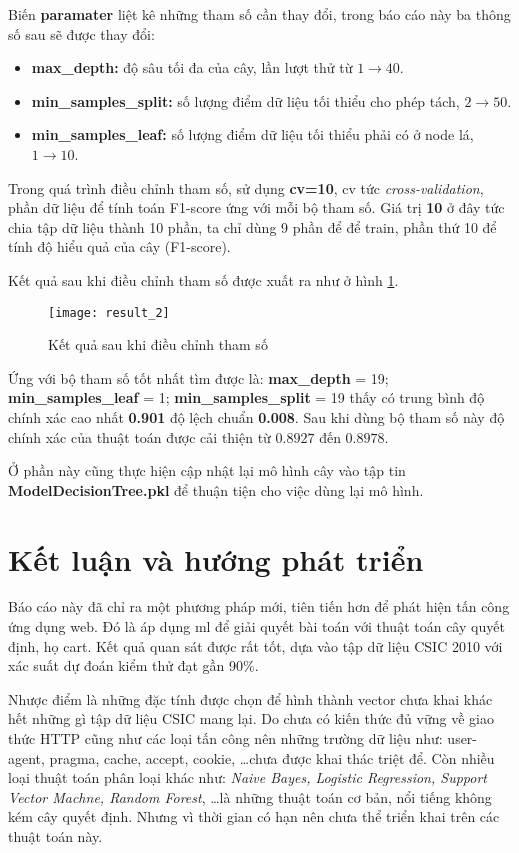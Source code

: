 \documentclass[../main-report.tex]{subfiles}
\begin{document}
Biến \textbf{paramater} liệt kê những tham số cần thay đổi, trong báo cáo này ba thông số sau sẽ được thay đổi:

\begin{itemize}
\item \textbf{max\_depth:} độ sâu tối đa của cây, lần lượt thử từ $1 \to 40$.
\item \textbf{min\_samples\_split:} số lượng điểm dữ liệu tối thiểu cho phép tách, $2 \to 50$.
\item \textbf{min\_samples\_leaf:} số lượng điểm dữ liệu tối thiểu phải có ở node lá, $1 \to 10$.
\end{itemize}

Trong quá trình điều chỉnh tham số, sử dụng \textbf{cv=10}, cv tức \emph{cross-validation}, phần dữ liệu để tính toán F1-score ứng với mỗi bộ tham số. Giá trị \textbf{10} ở đây tức chia tập dữ liệu thành 10 phần, ta chỉ dùng 9 phần để để train, phần thứ 10 để tính độ hiểu quả của cây (F1-score).

Kết quả sau khi điều chỉnh tham số được xuất ra như ở hình \ref{fig:result_2}.

\begin{figure}[ht!]
\centering\texttt{[image: result\_2]}
\caption{Kết quả sau khi điều chỉnh tham số}
\label{fig:result_2}
\end{figure}

Ứng với bộ tham số tốt nhất tìm được là: \textbf{max\_depth} = 19; \textbf{min\_samples\_leaf} = 1; \textbf{min\_samples\_split} = 19  thấy có trung bình độ chính xác cao nhất \textbf{0.901} độ lệch chuẩn \textbf{0.008}. Sau khi dùng bộ tham số này độ chính xác của thuật toán được cải thiện từ $0.8927$ đến $0.8978$.

Ở phần này cũng thực hiện cập nhật lại mô hình cây vào tập tin \textbf{ModelDecisionTree.pkl} để thuận tiện cho việc dùng lại mô hình.

\section{Kết luận và hướng phát triển}
Báo cáo này đã chỉ ra một phương pháp mới, tiên tiến hơn để phát hiện tấn công ứng dụng web. Đó là áp dụng \gls{ml} để giải quyết bài toán với thuật toán cây quyết định, họ \acrshort{cart}. Kết quả quan sát được rất tốt, dựa vào tập dữ liệu CSIC 2010 với xác suất dự đoán kiểm thử đạt gần 90\%.

Nhược điểm là những đặc tính được chọn để hình thành vector chưa khai khác hết những gì tập dữ liệu CSIC mang lại. Do chưa có kiến thức đủ vững về giao thức HTTP cũng như các loại tấn công nên những trường dữ liệu như: user-agent, pragma, cache, accept, cookie, \ldots chưa được khai thác triệt để. Còn nhiều loại thuật toán phân loại khác như: \emph{Naive Bayes, Logistic Regression, Support Vector Machne, Random Forest}, \ldots là những thuật toán cơ bản, nổi tiếng không kém cây quyết định. Nhưng vì thời gian có hạn nên chưa thể triển khai trên các thuật toán này.
\end{document}
